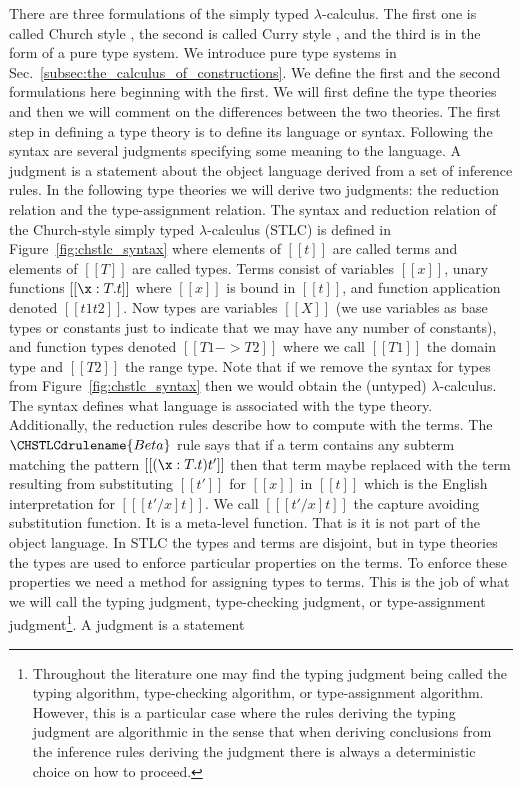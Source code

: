 There are three formulations of the simply typed $\lambda$-calculus.
The first one is called Church style
\cite{Girard:1989,Barendregt:1992,Church:1940}, the second is called
Curry style \cite{Barendregt:1992,Reynolds:1998}, and the third is in
the form of a pure type system.  We introduce pure type systems in
Sec.~\ref{subsec:the_calculus_of_constructions}.  We define the first
and the second formulations here beginning with the first.  We will
first define the type theories and then we will comment on the
differences between the two theories.  The first step in defining a
type theory is to define its language or syntax.  Following the syntax
are several judgments specifying some meaning to the language.  A
judgment is a statement about the object language derived from a set
of inference rules.  In the following type theories we will derive two
judgments: the reduction relation and the type-assignment relation.
The syntax and reduction relation of the Church-style simply typed
$\lambda$-calculus (STLC) is defined in
Figure~\ref{fig:chstlc_syntax} where elements of $[[t]]$ are called
terms and elements of $[[T]]$ are called types. Terms consist of
variables $[[x]]$, unary functions $[[\x:T.t]]$ where $[[x]]$ is bound
in $[[t]]$, and function application denoted $[[t1 t2]]$.  Now types
are variables $[[X]]$ (we use variables as base types or constants
just to indicate that we may have any number of constants), 
and function types denoted $[[T1 -> T2]]$ where we call
$[[T1]]$ the domain type and $[[T2]]$ the range type.  Note that if we
remove the syntax for types from Figure~\ref{fig:chstlc_syntax} then
we would obtain the (untyped) $\lambda$-calculus.  The syntax defines
what language is associated with the type theory.  Additionally, the
reduction rules describe how to compute with the terms.  The
$\CHSTLCdrulename{Beta}$ rule says that if a term contains any subterm
matching the pattern $[[(\x:T.t) t']]$ then that term maybe replaced
with the term resulting from substituting $[[t']]$ for $[[x]]$ in
$[[t]]$ which is the English interpretation for $[[ [t'/x]t]]$. We call
$[[ [t'/x] t]]$ the capture avoiding substitution function. It is a
meta-level function. That is it is not part of the object language. In STLC
the types and terms are disjoint, but in type theories the types are
used to enforce particular properties on the terms.  To enforce these
properties we need a method for assigning types to terms.  This is the
job of what we will call the typing judgment, type-checking judgment,
or type-assignment judgment\footnote{Throughout the literature one may
  find the typing judgment being called the typing algorithm,
  type-checking algorithm, or type-assignment algorithm.  However,
  this is a particular case where the rules deriving the typing judgment
  are algorithmic in the sense that when deriving conclusions from the
  inference rules deriving the judgment there is always a
  deterministic choice on how to proceed.}.  A judgment is a statement
